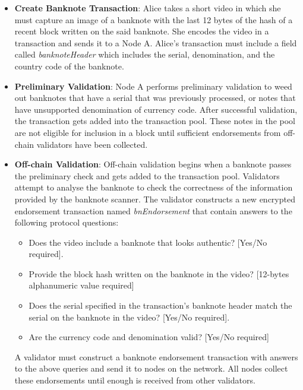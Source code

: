 \begin{itemize}
	\item \textbf{Create Banknote Transaction}: Alice takes a short video in which she must capture an image of a banknote with the last 12 bytes of the hash of a recent block written on the said banknote. She encodes the video in a transaction and sends it to a Node A. Alice’s transaction must include a field called \textit{banknoteHeader} which includes the serial, denomination, and the country code of the banknote.
	\item \textbf{Preliminary Validation}: Node A performs preliminary validation to weed out banknotes that have a serial that was previously processed, or notes that have unsupported denomination of currency code. After successful validation, the transaction gets added into the transaction pool. These notes in the pool are not eligible for inclusion in a block until sufficient endorsements from off-chain validators have been collected.
	\item \textbf{Off-chain Validation}: Off-chain validation begins when a banknote passes the preliminary check and gets added to the transaction pool. Validators attempt to analyse the banknote to check the correctness of the information provided by the banknote scanner. The validator constructs a new encrypted endorsement transaction named \textit{bnEndorsement} that contain answers to the following protocol questions:
	\begin{itemize}
		\item Does the video include a banknote that looks authentic? [Yes/No required].
		\item Provide the block hash written on the banknote in the video? [12-bytes alphanumeric value required]
		\item Does the serial specified in the transaction’s banknote header match the serial on the banknote in the video? [Yes/No required].
		\item Are the currency code and denomination valid? [Yes/No required]
	\end{itemize}
	
	A validator must construct a banknote endorsement transaction with answers to the above queries and send it to nodes on the network. All nodes collect these endorsements until enough is received from other validators.
	

\end{itemize}
